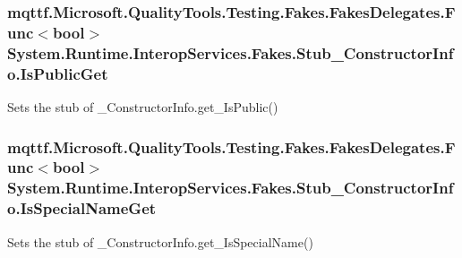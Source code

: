 \hypertarget{class_system_1_1_runtime_1_1_interop_services_1_1_fakes_1_1_stub___constructor_info_ab1269330e55f0e9f2b360a2980d20894}{
\subsubsection[{Is\-Public\-Get}]{\setlength{\rightskip}{0pt plus 5cm}mqttf.\-Microsoft.\-Quality\-Tools.\-Testing.\-Fakes.\-Fakes\-Delegates.\-Func$<$bool$>$ System.\-Runtime.\-Interop\-Services.\-Fakes.\-Stub\-\_\-\-Constructor\-Info.\-Is\-Public\-Get}}\label{class_system_1_1_runtime_1_1_interop_services_1_1_fakes_1_1_stub___constructor_info_ab1269330e55f0e9f2b360a2980d20894}


Sets the stub of \-\_\-\-Constructor\-Info.\-get\-\_\-\-Is\-Public()

\hypertarget{class_system_1_1_runtime_1_1_interop_services_1_1_fakes_1_1_stub___constructor_info_af273883729443e0a34f9930ddc6e959d}{
\subsubsection[{Is\-Special\-Name\-Get}]{\setlength{\rightskip}{0pt plus 5cm}mqttf.\-Microsoft.\-Quality\-Tools.\-Testing.\-Fakes.\-Fakes\-Delegates.\-Func$<$bool$>$ System.\-Runtime.\-Interop\-Services.\-Fakes.\-Stub\-\_\-\-Constructor\-Info.\-Is\-Special\-Name\-Get}}\label{class_system_1_1_runtime_1_1_interop_services_1_1_fakes_1_1_stub___constructor_info_af273883729443e0a34f9930ddc6e959d}


Sets the stub of \-\_\-\-Constructor\-Info.\-get\-\_\-\-Is\-Special\-Name()

